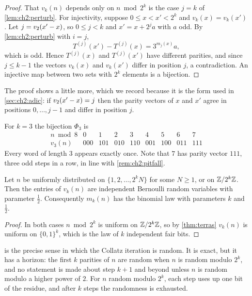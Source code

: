 \begin{proof}
That $v_k(n)$ depends only on $n\bmod2^k$ is the case $j=k$ of
\cref{lem:ch2:perturb}. For injectivity, suppose $0\leq x<x'<2^k$ and
$v_k(x)=v_k(x')$. Let $j=v_2(x'-x)$, so $0\leq j<k$ and $x'=x+2^ja$ with $a$
odd. By \cref{lem:ch2:perturb} with $i=j$,
\[
  T^{(j)}(x')-T^{(j)}(x)=3^{m_j(x)}a ,
\]
which is odd. Hence $T^{(j)}(x)$ and $T^{(j)}(x')$ have different parities,
and since $j\leq k-1$ the vectors $v_k(x)$ and $v_k(x')$ differ in position
$j$, a contradiction. An injective map between two sets with $2^k$ elements is
a bijection.
\end{proof}

The proof shows a little more, which we record because it is the form used in
\cref{sec:ch2:adic}: if $v_2(x'-x)=j$ then the parity vectors of $x$ and $x'$
agree in positions $0,\ldots,j-1$ and differ in position $j$.

\begin{example}\label{ex:ch2:small}
For $k=3$ the bijection $\Phi_3$ is
\[
\begin{array}{c|cccccccc}
n\bmod8 & 0&1&2&3&4&5&6&7\\ \hline
v_3(n) & 000&101&010&110&001&100&011&111
\end{array}
\]
Every word of length $3$ appears exactly once. Note that $7$ has parity vector
$111$, three odd steps in a row, in line with \cref{rem:ch2:pitfall}.
\end{example}

\begin{corollary}\label{cor:ch2:iid}
Let $n$ be uniformly distributed on $\{1,2,\ldots,2^kN\}$ for some $N\geq1$, or
on $\mathbb{Z}/2^k\mathbb{Z}$. Then the entries of $v_k(n)$ are independent Bernoulli random
variables with parameter $\tfrac12$. Consequently $m_k(n)$ has the binomial
law with parameters $k$ and $\tfrac12$.
\end{corollary}

\begin{proof}
In both cases $n\bmod2^k$ is uniform on $\mathbb{Z}/2^k\mathbb{Z}$, so by \cref{thm:terras}
$v_k(n)$ is uniform on $\{0,1\}^k$, which is the law of $k$ independent fair
bits.
\end{proof}

 is the precise sense in which the Collatz iteration is
random. It is exact, but it has a horizon: the first $k$ parities of $n$ are
random when $n$ is random modulo $2^k$, and no statement is made about step
$k+1$ and beyond unless $n$ is random modulo a higher power of $2$.
For $n$ random modulo $2^k$, each step uses up one bit of the residue, and after $k$ steps the randomness is exhausted.

